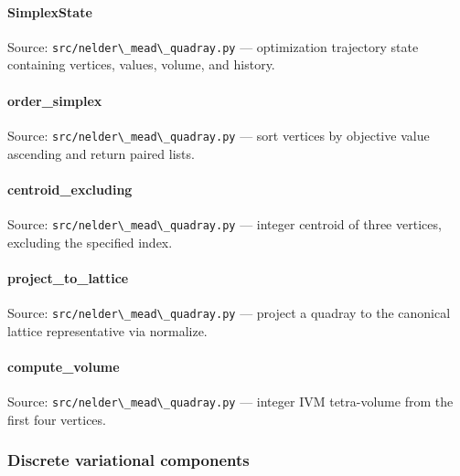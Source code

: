 \documentclass[
  10pt,
]{article}
\newcommand{\passthrough}[1]{#1}
\renewcommand{\texttt}[1]{%
    \colorbox{codebg}{\color{codefg}\ttfamily #1}%
}
\begin{document}
\hypertarget{code:SimplexState}{%
\paragraph{\texorpdfstring{\texttt{SimplexState}}{SimplexState}}\label{code:SimplexState}}

Source: \passthrough{\lstinline!src/nelder\_mead\_quadray.py!} ---
optimization trajectory state containing vertices, values, volume, and
history.

\hypertarget{code:order_simplex}{%
\paragraph{\texorpdfstring{\texttt{order\_simplex}}{order\_simplex}}\label{code:order_simplex}}

Source: \passthrough{\lstinline!src/nelder\_mead\_quadray.py!} --- sort
vertices by objective value ascending and return paired lists.

\hypertarget{code:centroid_excluding}{%
\paragraph{\texorpdfstring{\texttt{centroid\_excluding}}{centroid\_excluding}}\label{code:centroid_excluding}}

Source: \passthrough{\lstinline!src/nelder\_mead\_quadray.py!} ---
integer centroid of three vertices, excluding the specified index.

\hypertarget{code:project_to_lattice}{%
\paragraph{\texorpdfstring{\texttt{project\_to\_lattice}}{project\_to\_lattice}}\label{code:project_to_lattice}}

Source: \passthrough{\lstinline!src/nelder\_mead\_quadray.py!} ---
project a quadray to the canonical lattice representative via normalize.

\hypertarget{code:compute_volume}{%
\paragraph{\texorpdfstring{\texttt{compute\_volume}}{compute\_volume}}\label{code:compute_volume}}

Source: \passthrough{\lstinline!src/nelder\_mead\_quadray.py!} ---
integer IVM tetra-volume from the first four vertices.

\hypertarget{code:discrete_variational}{%
\subsubsection{Discrete variational
components}\label{code:discrete_variational}}
\end{document}
